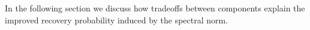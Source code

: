 \documentclass[12pt]{amsart}
\theoremstyle{remark}
\newtheorem{remark}[lemma]{Remark}
\DeclareMathOperator*{\argmin}{arg\,min}
\begin{document}




In the following section we discuss how tradeoffs between components explain the improved recovery probability induced by the spectral norm.
\end{document}
